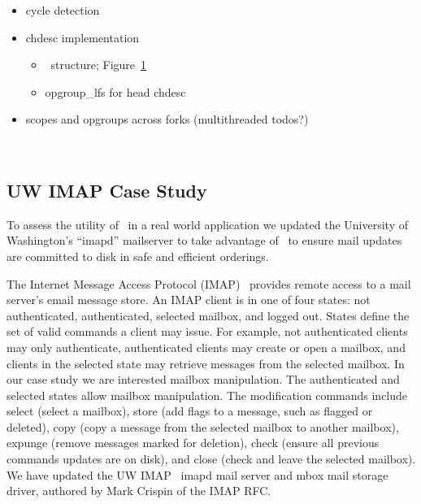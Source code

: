 \begin{itemize}
\item cycle detection
\item chdesc implementation
  \begin{itemize}
  \item \chdesc\ structure; Figure~\ref{fig:opgroup-chdescs}
  \item opgroup\_lfs for head chdesc
  \end{itemize}
\item scopes and opgroups across forks (multithreaded todos?)
\end{itemize}

\begin{figure}[htb]
\caption{\label{fig:opgroup-chdescs} \Opgroup\ \chdescs}
\end{figure}

\subsection{UW IMAP Case Study}
\label{sec:opgroup:uwimap}


To assess the utility of \opgroups\ in a real world application we
updated the University of Washington's ``imapd'' mailserver to take
advantage of \opgroups\ to ensure mail updates are committed to disk
in safe and efficient orderings.

The Internet Message Access Protocol (IMAP)~\cite{rfc3501} provides
remote access to a mail server's email message store. An IMAP client
is in one of four states: not authenticated, authenticated, selected
mailbox, and logged out. States define the set of valid commands a
client may issue. For example, not authenticated clients may only
authenticate, authenticated clients may create or open a mailbox, and
clients in the selected state may retrieve messages from the selected
mailbox. In our case study we are interested mailbox manipulation. The
authenticated and selected states allow mailbox manipulation. The
modification commands include select (select a mailbox), store (add
flags to a message, such as flagged or deleted), copy (copy a message
from the selected mailbox to another mailbox), expunge (remove
messages marked for deletion), check (ensure all previous commands
updates are on disk), and close (check and leave the selected
mailbox). We have updated the UW IMAP~\cite{uwimap} imapd mail server
and mbox mail storage driver, authored by Mark Crispin of the IMAP RFC.

